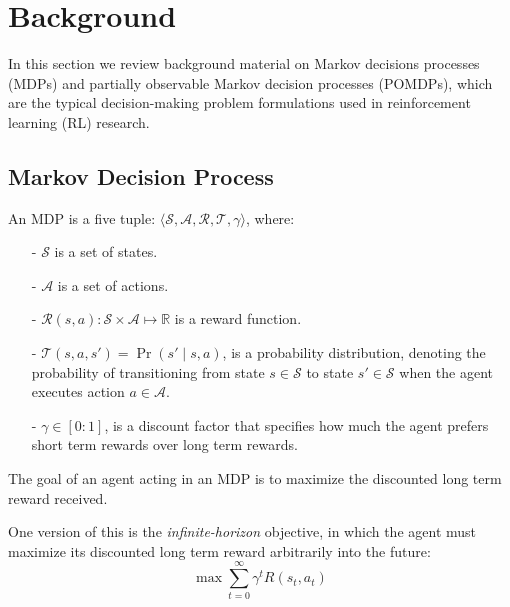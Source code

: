 \documentclass[11pt]{article}
\begin{document}


\section{Background}

In this section we review background material on Markov decisions processes (MDPs) and partially observable Markov decision processes (POMDPs), which are the typical decision-making problem formulations used in reinforcement learning (RL) research.

\subsection{Markov Decision Process}

An MDP is a five tuple: $\langle \mathcal{S}, \mathcal{A}, \mathcal{R}, \mathcal{T}, \gamma \rangle$, where:
\begin{itemize}
\item[-] $\mathcal{S}$ is a set of states.
\item[-] $\mathcal{A}$ is a set of actions.
\item[-] $\mathcal{R}(s,a) : \mathcal{S} \times \mathcal{A} \mapsto \mathbb{R}$ is a reward function.
\item[-] $\mathcal{T}(s,a,s') = \Pr(s' \mid s, a)$, is a probability distribution, denoting the probability of transitioning from state $s \in \mathcal{S}$ to state $s' \in \mathcal{S}$ when the agent executes action $a \in \mathcal{A}$.
\item[-] $\gamma \in [0:1]$, is a discount factor that specifies how much the agent prefers short term rewards over long term rewards.
\end{itemize}

The goal of an agent acting in an MDP is to maximize the discounted long term reward received. 

One version of this is the {\it infinite-horizon} objective, in which the agent must maximize its discounted long term reward arbitrarily into the future:
\begin{equation}
\max \sum_{t=0}^{\infty} \gamma^t R(s_t,a_t)
\end{equation}
\end{document}

